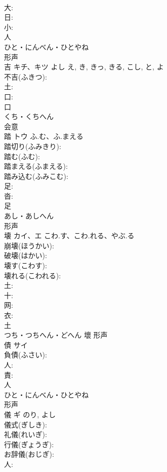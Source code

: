 \documentclass[8pt]{extreport}
\begin{document}
\begin{CJK}{UTF8}{min}
\\	大: 
\\	日: 
\\	小: 
\\	人	
\\	ひと・にんべん・ひとやね	
\\	形声 
\\	吉	キチ、キツ	よし	え, き, きっ, きる, こし, と, よ	
\\	不吉(ふきつ): 
\\	土: 
\\	口: 
\\	口	
\\	くち・くちへん	
\\	会意 
\\	踏	トウ	ふ.む、ふ.まえる		
\\	踏切り(ふみきり): 
\\	踏む(ふむ): 
\\	踏まえる(ふまえる): 
\\	踏み込む(ふみこむ): 
\\	足: 
\\	沓: 
\\	足	
\\	あし・あしへん	
\\	形声 
\\	壊	カイ、エ	こわ.す、こわ.れる、やぶ.る		
\\	崩壊(ほうかい): 
\\	破壊(はかい): 
\\	壊す(こわす): 
\\	壊れる(こわれる): 
\\	土: 
\\	十: 
\\	网: 
\\	衣: 
\\	土	
\\	つち・つちへん・どへん	壞	形声 
\\	債	サイ			
\\	負債(ふさい): 
\\	人: 
\\	責: 
\\	人	
\\	ひと・にんべん・ひとやね	
\\	形声 
\\	儀	ギ		のり, よし	
\\	儀式(ぎしき): 
\\	礼儀(れいぎ): 
\\	行儀(ぎょうぎ): 
\\	お辞儀(おじぎ): 
\\	人: 

\end{CJK}
\end{document}
